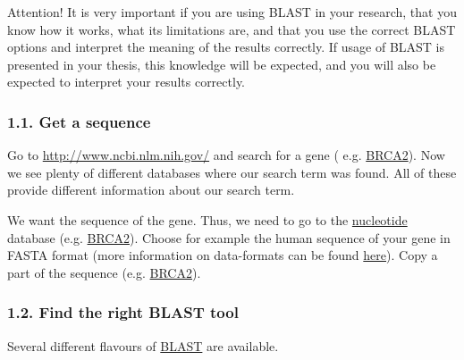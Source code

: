 \documentclass[]{article}
\begin{document}
Attention! It is very important if you are using BLAST in your research,
that you know how it works, what its limitations are, and that you use
the correct BLAST options and interpret the meaning of the results
correctly. If usage of BLAST is presented in your thesis, this knowledge
will be expected, and you will also be expected to interpret your
results correctly.

\subsubsection{1.1. Get a sequence}\label{get-a-sequence}

Go to \url{http://www.ncbi.nlm.nih.gov/} and search for a gene ( e.g.
\href{http://www.ncbi.nlm.nih.gov/gquery/?term=BRCA2}{BRCA2}). Now we
see plenty of different databases where our search term was found. All
of these provide different information about our search term.

We want the sequence of the gene. Thus, we need to go to the
\href{http://www.ncbi.nlm.nih.gov/nuccore}{nucleotide} database (e.g.
\href{http://www.ncbi.nlm.nih.gov/nuccore/?term=BRCA2}{BRCA2}). Choose
for example the human sequence of your gene in FASTA format (more
information on data-formats can be found
\href{http://compbio.massey.ac.nz/wiki/\#!bioinf_files.md}{here}). Copy
a part of the sequence (e.g.
\href{http://www.ncbi.nlm.nih.gov/nuccore/1161383?report=fasta}{BRCA2}).

\subsubsection{1.2. Find the right BLAST
tool}\label{find-the-right-blast-tool}

Several different flavours of
\href{http://blast.ncbi.nlm.nih.gov/}{BLAST} are available.
\end{document}
